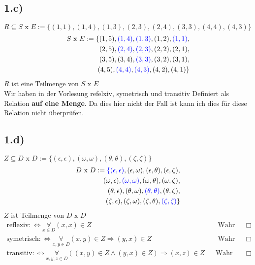 \documentclass[10pt,ngerman]{scrartcl}
\begin{document}
\subsection{1.c)}
$R \subseteq S\text{ x }E := \{(1, 1), (1, 4), (1, 3), (2, 3), (2, 4), (3, 3), (4, 4), (4, 3)\}$
\begin{align*}
S\text{ x }E := \{(1,5),\color{blue}(1,4)\color{black},\color{blue}(1,3)\color{black},(1,2),\color{blue}(1,1)\color{black},\\
(2,5),\color{blue}(2,4)\color{black},\color{blue}(2,3)\color{black},(2,2),(2,1),\\
(3,5),(3,4),\color{blue}(3,3)\color{black},(3,2),(3,1),\\
(4,5),\color{blue}(4,4)\color{black},\color{blue}(4,3)\color{black},(4,2),(4,1)\}
\end{align*}
$R$ ist eine Teilmenge von $S\text{ x }E $\\
Wir haben in der Vorlesung refelxiv, symetrisch und transitiv Definiert als Relation \textbf{auf eine Menge}. Da dies hier nicht der Fall ist kann ich dies für diese Relation nicht überprüfen.
\subsection{1.d)}
$Z \subseteq D\text{ x }D := \{(\epsilon, \epsilon), (\omega, \omega), (\theta, \theta), (\zeta, \zeta)\}$
\begin{align*}
 D\text{ x }D :=\color{blue} \{(\epsilon,\epsilon)\color{black},(\epsilon,\omega),(\epsilon,\theta),(\epsilon,\zeta),\\
 (\omega,\epsilon),\color{blue}(\omega,\omega)\color{black},(\omega,\theta),(\omega,\zeta),\\
 (\theta,\epsilon),(\theta,\omega),\color{blue}(\theta,\theta)\color{black},(\theta,\zeta),\\
 (\zeta,\epsilon),(\zeta,\omega),(\zeta,\theta),\color{blue}(\zeta,\zeta)\color{black}\}
\end{align*}
$Z$ ist Teilmenge von $D\text{ x }D $
\begin{align*}
\text{reflexiv}: \Leftrightarrow \underset{x \in D}{\forall} (x,x) \in Z && \text{ Wahr}&&\Box\\
\text{symetrisch}: \Leftrightarrow \underset{x,y \in D}{\forall} (x,y) \in Z \Rightarrow (y,x) \in Z && \text{ Wahr}&& \Box\\
\text{transitiv}: \Leftrightarrow \underset{x,y,z \in D}{\forall} ((x,y) \in Z \wedge (y,x) \in Z) \Rightarrow (x,z) \in Z && \text{Wahr} && \Box
\end{align*}
\end{document}
